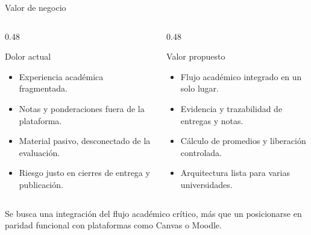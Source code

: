 \documentclass[aspectratio=169,10pt]{beamer}
\begin{document}
\begin{frame}{Valor de negocio}
\begin{columns}[T,onlytextwidth]
\begin{column}{0.48\textwidth}
\begin{block}{Dolor actual}
\begin{itemize}
  \item Experiencia académica fragmentada.
  \item Notas y ponderaciones fuera de la plataforma.
  \item Material pasivo, desconectado de la evaluación.
  \item Riesgo justo en cierres de entrega y publicación.
\end{itemize}
\end{block}
\end{column}
\begin{column}{0.48\textwidth}
\begin{block}{Valor propuesto}
\begin{itemize}
  \item Flujo académico integrado en un solo lugar.
  \item Evidencia y trazabilidad de entregas y notas.
  \item Cálculo de promedios y liberación controlada.
  \item Arquitectura lista para varias universidades.
\end{itemize}
\end{block}
\end{column}
\end{columns}
\vspace{0.2cm}
{\footnotesize Se busca una integración del flujo académico crítico, más que un posicionarse en paridad funcional con plataformas como Canvas o Moodle.}
\end{frame}
\end{document}
